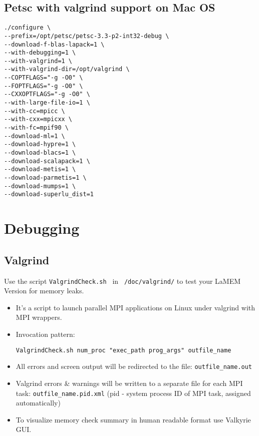 \documentclass{scrartcl}
\begin{document}
\subsection{Petsc with valgrind support on Mac OS}
\begin{Verbatim}[frame=single]
./configure \
--prefix=/opt/petsc/petsc-3.3-p2-int32-debug \
--download-f-blas-lapack=1 \
--with-debugging=1 \
--with-valgrind=1 \
--with-valgrind-dir=/opt/valgrind \
--COPTFLAGS="-g -O0" \
--FOPTFLAGS="-g -O0" \
--CXXOPTFLAGS="-g -O0" \
--with-large-file-io=1 \
--with-cc=mpicc \
--with-cxx=mpicxx \
--with-fc=mpif90 \
--download-ml=1 \
--download-hypre=1 \
--download-blacs=1 \
--download-scalapack=1 \
--download-metis=1 \
--download-parmetis=1 \
--download-mumps=1 \
--download-superlu_dist=1
\end{Verbatim} 
 

\section{Debugging}

\subsection{Valgrind}
Use the script \verb-ValgrindCheck.sh - in \verb- /doc/valgrind/- to test your LaMEM Version for memory leaks.

\begin{itemize}
\item  It's a script to launch parallel MPI applications on Linux under valgrind with MPI wrappers.
\item Invocation pattern:
\begin{verbatim}
ValgrindCheck.sh num_proc "exec_path prog_args" outfile_name
\end{verbatim}
\item All errors and screen output will be redirected to the file: \verb-outfile_name.out-
\item Valgrind errors \& warnings will be written to a separate file for each MPI task: \verb-outfile_name.pid.xml- (pid - system process ID of MPI task, assigned automatically)
\item To visualize memory check summary in human readable format use Valkyrie GUI.
\end{itemize}
 
\end{document}
